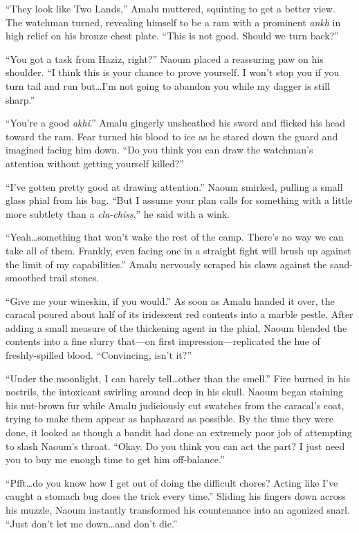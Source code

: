 ``They look like Two Lands,'' Amalu muttered, squinting to get a better view. The watchman turned, revealing himself to be a ram with a prominent \emph{ankh} in high relief on his bronze chest plate. ``This is not good. Should we turn back?''

``You got a task from Haziz, right?'' Naoum placed a reassuring paw on his shoulder. ``I think this is your chance to prove yourself. I won't stop you if you turn tail and run but\ldots I'm not going to abandon you while my dagger is still sharp.''

``You're a good \emph{akhi}.'' Amalu gingerly unsheathed his sword and flicked his head toward the ram. Fear turned his blood to ice as he stared down the guard and imagined facing him down. ``Do you think you can draw the watchman's attention without getting yourself killed?''

``I've gotten pretty good at drawing attention.'' Naoum smirked, pulling a small glass phial from his bag. ``But I assume your plan calls for something with a little more subtlety than a \emph{cla-chiss},'' he said with a wink.

``Yeah\ldots something that won't wake the rest of the camp. There's no way we can take all of them. Frankly, even facing one in a straight fight will brush up against the limit of my capabilities.'' Amalu nervously scraped his claws against the sand-smoothed trail stones.

``Give me your wineskin, if you would.'' As soon as Amalu handed it over, the caracal poured about half of its iridescent red contents into a marble pestle. After adding a small measure of the thickening agent in the phial, Naoum blended the contents into a fine slurry that---on first impression---replicated the hue of freshly-spilled blood. ``Convincing, isn't it?''

``Under the moonlight, I can barely tell\ldots other than the smell.'' Fire burned in his nostrils, the intoxicant swirling around deep in his skull. Naoum began staining his nut-brown fur while Amalu judiciously cut swatches from the caracal's coat, trying to make them appear as haphazard as possible. By the time they were done, it looked as though a bandit had done an extremely poor job of attempting to slash Naoum's throat. ``Okay. Do you think you can act the part? I just need you to buy me enough time to get him off-balance.''

``Pfft\ldots do you know how I get out of doing the difficult chores? Acting like I've caught a stomach bug does the trick every time.'' Sliding his fingers down across his muzzle, Naoum instantly transformed his countenance into an agonized snarl. ``Just don't let me down\ldots and don't die.''

